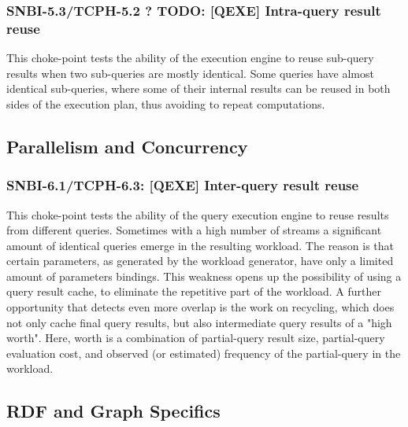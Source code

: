 \subsubsection{SNBI-5.3/TCPH-5.2 ? TODO: [QEXE] Intra-query result reuse}
\label{choke_point_5.3}
This choke-point tests the ability of the execution engine to reuse sub-query results when two sub-queries are mostly identical.
Some queries have almost identical sub-queries, where some of their internal results can be reused in both sides of the execution plan, thus avoiding to repeat computations.


\subsection{Parallelism and Concurrency}

\subsubsection{SNBI-6.1/TCPH-6.3: [QEXE] Inter-query result reuse}
\label{choke_point_6.1}
This choke-point tests the ability of the query execution engine to reuse results from different queries. Sometimes with a high number of streams a significant amount of identical queries emerge in the resulting workload.
The reason is that certain parameters, as generated by the workload generator, have only a limited amount of parameters bindings.
This weakness opens up the possibility of using a query result cache, to eliminate the repetitive part of the workload.
A further opportunity that detects even more overlap is the work on recycling, which does not only cache final query results, but also intermediate query results of a "high worth".
Here, worth is a combination of partial-query result size, partial-query evaluation cost, and observed (or estimated) frequency of the partial-query in the workload.


\subsection{RDF and Graph Specifics}



